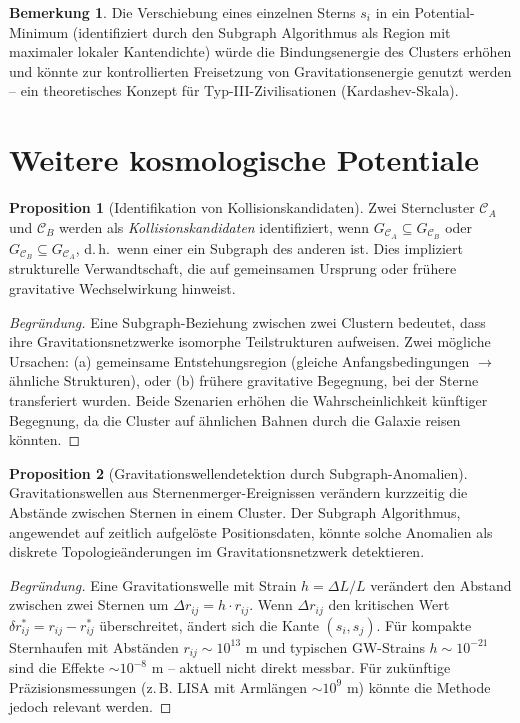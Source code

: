 ﻿\documentclass[a4paper,12pt]{report}
\theoremstyle{definition}
\newtheorem{bemerkung}{Bemerkung}
\newtheorem{proposition}{Proposition}
\begin{document}
\begin{bemerkung}
Die Verschiebung eines einzelnen Sterns $s_i$ in ein Potential-Minimum (identifiziert durch den Subgraph Algorithmus als Region mit maximaler lokaler Kantendichte) würde die Bindungsenergie des Clusters erhöhen und könnte zur kontrollierten Freisetzung von Gravitationsenergie genutzt werden -- ein theoretisches Konzept für Typ-III-Zivilisationen (Kardashev-Skala).
\end{bemerkung}

\section{Weitere kosmologische Potentiale}

\begin{proposition}[Identifikation von Kollisionskandidaten]
Zwei Sterncluster $\mathcal{C}_A$ und $\mathcal{C}_B$ werden als \emph{Kollisionskandidaten} identifiziert, wenn $G_{\mathcal{C}_A} \subseteq G_{\mathcal{C}_B}$ oder $G_{\mathcal{C}_B} \subseteq G_{\mathcal{C}_A}$, d.\,h.\ wenn einer ein Subgraph des anderen ist. Dies impliziert strukturelle Verwandtschaft, die auf gemeinsamen Ursprung oder frühere gravitative Wechselwirkung hinweist.
\end{proposition}

\begin{proof}[Begründung]
Eine Subgraph-Beziehung zwischen zwei Clustern bedeutet, dass ihre Gravitationsnetzwerke isomorphe Teilstrukturen aufweisen. Zwei mögliche Ursachen: (a) gemeinsame Entstehungsregion (gleiche Anfangsbedingungen $\to$ ähnliche Strukturen), oder (b) frühere gravitative Begegnung, bei der Sterne transferiert wurden. Beide Szenarien erhöhen die Wahrscheinlichkeit künftiger Begegnung, da die Cluster auf ähnlichen Bahnen durch die Galaxie reisen könnten.
\end{proof}

\begin{proposition}[Gravitationswellendetektion durch Subgraph-Anomalien]
Gravitationswellen aus Sternenmerger-Ereignissen verändern kurzzeitig die Abstände zwischen Sternen in einem Cluster. Der Subgraph Algorithmus, angewendet auf zeitlich aufgelöste Positionsdaten, könnte solche Anomalien als diskrete Topologieänderungen im Gravitationsnetzwerk detektieren.
\end{proposition}

\begin{proof}[Begründung]
Eine Gravitationswelle mit Strain $h = \Delta L / L$ verändert den Abstand zwischen zwei Sternen um $\Delta r_{ij} = h \cdot r_{ij}$. Wenn $\Delta r_{ij}$ den kritischen Wert $\delta r_{ij}^* = r_{ij} - r_{ij}^*$ überschreitet, ändert sich die Kante $(s_i, s_j)$. Für kompakte Sternhaufen mit Abständen $r_{ij} \sim 10^{13}$ m und typischen GW-Strains $h \sim 10^{-21}$ sind die Effekte $\sim 10^{-8}$ m -- aktuell nicht direkt messbar. Für zukünftige Präzisionsmessungen (z.\,B. LISA mit Armlängen $\sim 10^9$ m) könnte die Methode jedoch relevant werden.
\end{proof}
\end{document}
